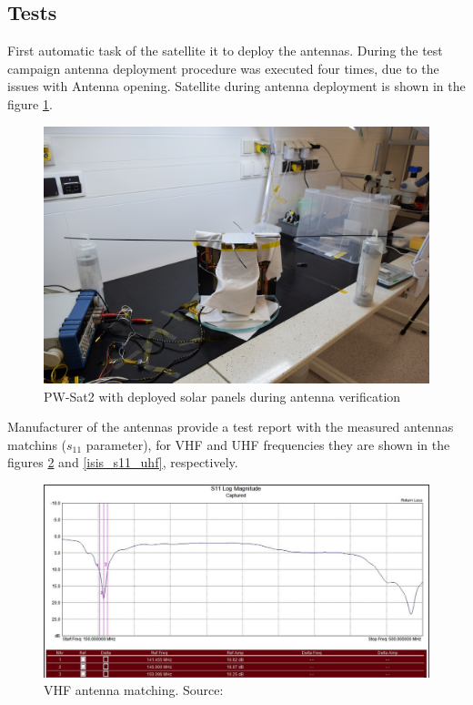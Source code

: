 \subsection{Tests}
First automatic task of the satellite it to deploy the antennas. During the test campaign antenna deployment procedure was executed four times, due to the issues with Antenna opening. Satellite during antenna deployment is shown in the figure \ref{pwsat_with_deployed_antennas}.

\begin{figure}
    \centering
    \includegraphics[width=0.8\paperwidth]{img/6/pwsat_with_deployed_antennas.JPG}
    \caption{PW-Sat2 with deployed solar panels during antenna verification}
    \label{pwsat_with_deployed_antennas}
\end{figure}

Manufacturer of the antennas provide a test report with the measured antennas matchins ($s_{11}$ parameter), for VHF and UHF frequencies they are shown in the figures \ref{isis_s11_vhf} and  \ref{isis_s11_uhf}, respectively.

\begin{figure}[H]
    \centering
    \includegraphics[width=0.8\paperwidth]{img/6/isis_s11_vhf.png}
    \caption{VHF antenna matching. Source: \cite{isis_ant_test_report}}
    \label{isis_s11_vhf}
\end{figure}

